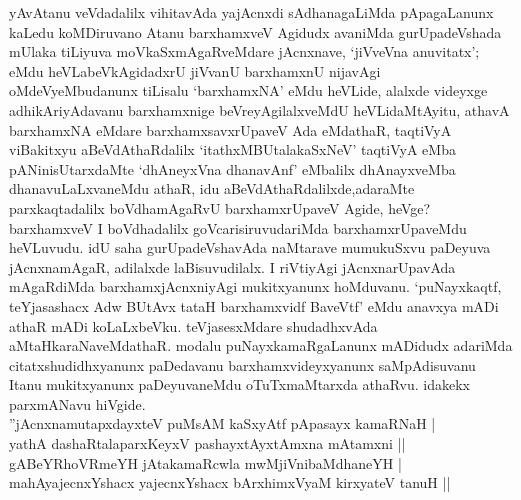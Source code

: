\begin{artha}
yAvAtanu veVdadalilx vihitavAda yajAcnxdi sAdhanagaLiMda pApagaLanunx kaLedu koMDiruvano Atanu barxhamxveV Agidudx avaniMda gurUpadeVshada mUlaka tiLiyuva moVkaSxmAgaRveMdare jAcnxnave, `jiVveVna anuvitatx'; eMdu heVLabeVkAgidadxrU jiVvanU barxhamxnU nijavAgi oMdeVyeMbudanunx tiLisalu `barxhamxNA' eMdu heVLide, alalxde videyxge adhikAriyAdavanu barxhamxnige beVreyAgilalxveMdU heVLidaMtAyitu, athavA barxhamxNA eMdare barxhamxsavxrUpaveV Ada eMdathaR, taqtiVyA viBakitxyu aBeVdAthaRdalilx `itathxMBUtalakaSxNeV' taqtiVyA eMba pANinisUtarxdaMte `dhAneyxVna dhanavAnf' eMbalilx dhAnayxveMba dhanavuLaLxvaneMdu athaR, idu aBeVdAthaRdalilxde,\break adaraMte parxkaqtadalilx boVdhamAgaRvU barxhamxrUpaveV Agide, heVge? barxhamxveV I boVdhadalilx goVcarisiruvudariMda barxhamxrUpaveMdu heVLuvudu. idU saha gurUpadeVshavAda naMtarave mumukuSxvu paDeyuva jAcnxnamAgaR, adilalxde laBisuvudilalx. I riVtiyAgi jAcnxnarUpavAda mAgaRdiMda barxhamxjAcnxniyAgi mukitxyanunx hoMduvanu. `puNayxkaqtf, teYjasashacx Adw BUtAvx tataH barxhamxvidf BaveVtf' eMdu anavxya mADi athaR mADi koLaLxbeVku. teVjasesxMdare shudadhxvAda aMtaHkaraNaveMdathaR. modalu puNayxkamaRgaLanunx mADidudx adariMda citatxshudidhxyanunx paDedavanu barxhamxvideyxyanunx saMpAdisuvanu Itanu mukitxyanunx paDeyuvaneMdu oTuTxmaMtarxda athaRvu. idakekx parxmANavu hiVgide.\\
''jAcnxnamutapxdayxteV puMsAM kaSxyAtf pApasayx kamaRNaH | \\ yathA  dashaRtalaparxKeyxV pashayxtAyxtAmxna mAtamxni ||\\
gABeYRhoVRmeYH jAtakamaRcwla mwMjiVnibaMdhaneYH |\\
mahAyajecnxYshacx yajecnxYshacx bArxhimxVyaM kirxyateV tanuH ||
\end{artha}

